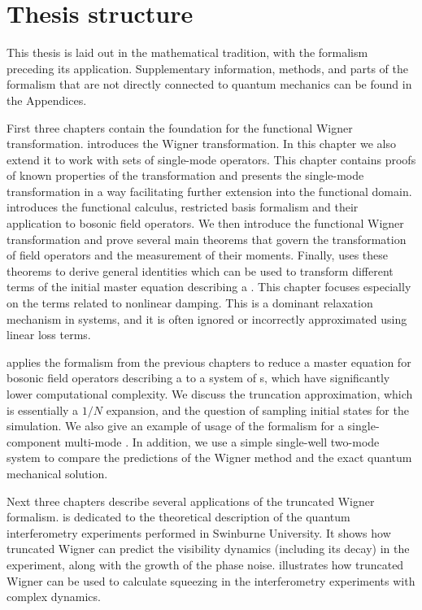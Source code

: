 \section{Thesis structure}

This thesis is laid out in the mathematical tradition, with the formalism preceding its application.
Supplementary information, methods, and parts of the formalism that are not directly connected to quantum mechanics can be found in the Appendices.

First three chapters contain the foundation for the functional Wigner transformation.
 introduces the Wigner transformation.
In this chapter we also extend it to work with sets of single-mode operators.
This chapter contains proofs of known properties of the transformation and presents the single-mode transformation in a way facilitating further extension into the functional domain.
 introduces the functional calculus, restricted basis formalism and their application to bosonic field operators.
We then introduce the functional Wigner transformation and prove several main theorems that govern the transformation of field operators and the measurement of their moments.
Finally,  uses these theorems to derive general identities which can be used to transform different terms of the initial master equation describing a .
This chapter focuses especially on the terms related to nonlinear damping.
This is a dominant relaxation mechanism in  systems, and it is often ignored or incorrectly approximated using linear loss terms.

 applies the formalism from the previous chapters to reduce a master equation for bosonic field operators describing a  to a system of s, which have significantly lower computational complexity.
We discuss the truncation approximation, which is essentially a $1/N$ expansion, and the question of sampling initial states for the simulation.
We also give an example of usage of the formalism for a single-component multi-mode .
In addition, we use a simple single-well two-mode system to compare the predictions of the Wigner method and the exact quantum mechanical solution.

Next three chapters describe several applications of the truncated Wigner formalism.
 is dedicated to the theoretical description of the quantum interferometry experiments performed in Swinburne University.
It shows how truncated Wigner can predict the visibility dynamics (including its decay) in the experiment, along with the growth of the phase noise.
 illustrates how truncated Wigner can be used to calculate squeezing in the interferometry experiments with complex dynamics.

